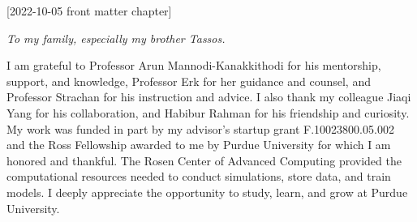 [2022-10-05 front matter chapter]
%
%
%
%
%
%

%
%
%
\begin{statement}
\end{statement}

\begin{dedication}
  \textit{To my family, especially my brother Tassos.}
\end{dedication}

\begin{acknowledgments}
  I am grateful to
  Professor Arun Mannodi-Kanakkithodi for his mentorship, support, and knowledge,
  Professor Erk for her guidance and counsel, and
  Professor Strachan for his instruction and advice.
  I also thank
  my colleague Jiaqi Yang for his collaboration, and
  Habibur Rahman for his friendship and curiosity.
  My work was funded in part by my advisor's startup grant F.10023800.05.002 and the Ross Fellowship awarded to me by Purdue University for which I am honored and thankful.
  The Rosen Center of Advanced Computing provided the computational
  resources needed to conduct simulations, store data, and train models.
  I deeply appreciate the opportunity to study, learn, and grow at Purdue University.
\end{acknowledgments}

